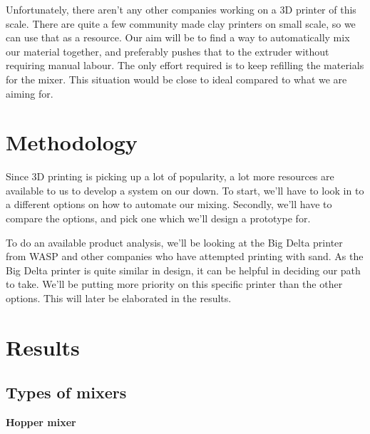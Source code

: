 \documentclass[12pt, a4paper]{article}
\begin{document}
Unfortunately, there aren't any other companies working on a 3D printer of this scale. There are quite a few community made clay printers on small scale, so we can use that as a resource. Our aim will be to find a way to automatically mix our material together, and preferably pushes that to the extruder without requiring manual labour. The only effort required is to keep refilling the materials for the mixer. This situation would be close to ideal compared to what we are aiming for.

\section{Methodology}
Since 3D printing is picking up a lot of popularity, a lot more resources are available to us to develop a system on our down. To start, we'll have to look in to a different options on how to automate our mixing. Secondly, we'll have to compare the options, and pick one which we'll design a prototype for. 

To do an available product analysis, we'll be looking at the Big Delta printer from WASP and other companies who have attempted printing with sand. As the Big Delta printer is quite similar in design, it can be helpful in deciding our path to take. We'll be putting more priority on this specific printer than the other options. This will later be elaborated in the results.
	\newpage

\section{Results}
\subsection{Types of mixers}
\textbf{Hopper mixer}
\end{document}
